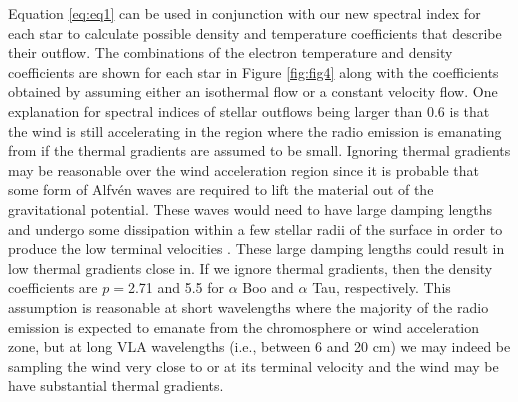 \documentclass[iop]{emulateapj}
\begin{document}
Equation \ref{eq:eq1} can be used in conjunction with our new spectral index for each star to calculate possible density and temperature coefficients that describe their outflow. The combinations of the electron temperature and density coefficients are shown for each star in Figure \ref{fig:fig4} along with the coefficients obtained by assuming either an isothermal flow or a constant velocity flow. One explanation for spectral indices of stellar outflows being larger than 0.6 is that the wind is still accelerating in the region where the radio emission is emanating from if the thermal gradients are assumed to be small. Ignoring thermal gradients may be reasonable over the wind acceleration region since it is probable that some form of Alfv\'en waves are required to lift the material out of the gravitational potential. These waves would need to have large damping lengths and undergo some dissipation within a few stellar radii of the surface in order to produce the low terminal velocities \citep{1980ApJ...242..260H}. These large damping lengths could result in low thermal gradients close in. If we ignore thermal gradients, then the density coefficients are $p=$2.71 and 5.5 for $\alpha$ Boo  and $\alpha$ Tau, respectively. This assumption is reasonable at short wavelengths where the majority of the radio emission is expected to emanate from the chromosphere or wind acceleration zone, but at long VLA wavelengths (i.e., between 6 and 20 cm) we may indeed be sampling the wind very close to or at its terminal velocity and the wind may be have substantial thermal gradients. 
\end{document}
